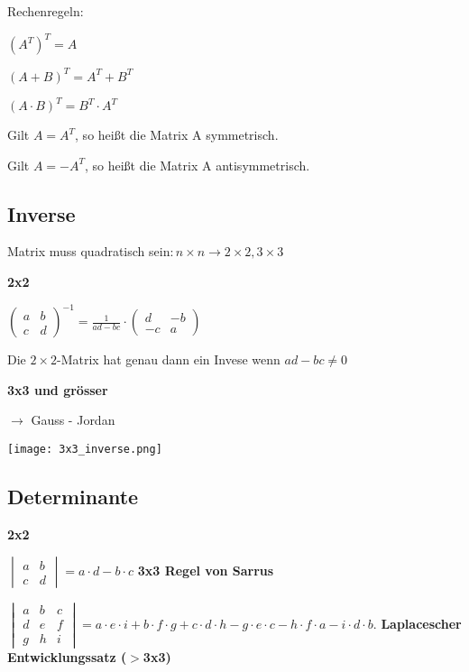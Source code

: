\begin{multicols*}{3}
    {Rechenregeln:}

    $ \left(A^{T}\right)^{T} = A $

    $ \left(A + B\right)^{T} = A^{T} + B^{T} $

    $ \left(A \cdot B\right)^{T} = B^{T} \cdot A^{T} $

    {Gilt $ A = A^{T} $, so heißt die Matrix A symmetrisch.}

    
    {Gilt $ A = -A^{T} $, so heißt die Matrix A antisymmetrisch.}

    \subsection{Inverse}
    {Matrix muss quadratisch sein$: n \times n \rightarrow 2\times2, 3\times3$}

    \textbf{2x2}

    {\large$\begin{pmatrix}
            a & b \\
            c & d
        \end{pmatrix}^{-1} = \frac{1}{ad-bc}\cdot\begin{pmatrix}
            d  & -b \\
            -c & a
        \end{pmatrix}$}

    {Die $2\times2$-Matrix hat genau dann ein Invese wenn $ad-bc \neq 0$}

    \textbf{3x3 und grösser}

    {$\rightarrow$ Gauss - Jordan}

    \texttt{[image: 3x3\_inverse.png]}
    \WhiteSpace

    \subsection{Determinante}
    {\textbf{2x2}}

    $\begin{vmatrix}
            a & b \\
            c & d
        \end{vmatrix} = a\cdot d - b\cdot c $
    \WhiteSpace
    \textbf{3x3 Regel von Sarrus}

    $\begin{vmatrix} a & b & c \\ d & e & f \\ g & h &i \end{vmatrix} = a \cdot e \cdot i + b \cdot f \cdot g + c \cdot d \cdot h - g \cdot e \cdot c - h \cdot f \cdot a - i \cdot d \cdot b.$
    \WhiteSpace
    \textbf{Laplacescher Entwicklungssatz ($ >$3x3)}


\end{multicols*}
